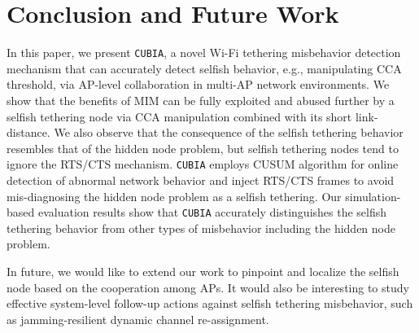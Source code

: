 \section{Conclusion and Future Work}
%
In this paper, we present {\tt CUBIA}, a novel Wi-Fi tethering misbehavior
detection mechanism that can accurately detect selfish behavior, e.g.,
manipulating CCA threshold, via AP-level collaboration in multi-AP
network environments.
%
We show that the benefits of MIM can be fully exploited and abused further
by a selfish tethering node via CCA manipulation combined with its short
link-distance.
%
We also observe that the consequence of the selfish tethering behavior resembles
that of the hidden node problem, but selfish tethering nodes tend to ignore
the RTS/CTS mechanism.
%
{\tt CUBIA} employs CUSUM algorithm for online detection of abnormal network
behavior and inject RTS/CTS frames to avoid mis-diagnosing the hidden node
problem as a selfish tethering.
%
Our simulation-based evaluation results show that {\tt CUBIA} accurately
distinguishes the selfish tethering behavior from other types of misbehavior
including the hidden node problem. 

In future, we would like to extend our work to pinpoint and localize
the selfish node based on the cooperation among APs.
It would also be interesting to study effective system-level follow-up 
actions against selfish tethering misbehavior, such as 
jamming-resilient dynamic channel re-assignment.

